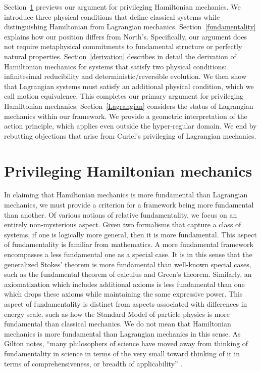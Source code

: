 \documentclass[12pt, twoside]{article}
\begin{document}
Section~\ref{privileging} previews our argument for privileging Hamiltonian mechanics. We introduce three physical conditions that define classical systems while distinguishing Hamiltonian from Lagrangian mechanics. Section~\ref{fundamentality} explains how our position differs from North's. Specifically, our argument does not require metaphysical commitments to fundamental structure or perfectly natural properties. Section~\ref{derivation} describes in detail the derivation of Hamiltonian mechanics for systems that satisfy two physical conditions: infinitesimal reducibility and deterministic/reversible evolution. We then show that Lagrangian systems must satisfy an additional physical condition, which we call motion equivalence. This completes our primary argument for privileging Hamiltonian mechanics. Section~\ref{Lagrangian} considers the status of Lagrangian mechanics within our framework. We provide a geometric interpretation of the action principle, which applies even outside the hyper-regular domain. We end by rebutting objections that arise from Curiel's \parencites*[]{Curiel} privileging of Lagrangian mechanics. 




\section{Privileging Hamiltonian mechanics}
\label{privileging}

In claiming that Hamiltonian mechanics is more fundamental than Lagrangian mechanics, we must provide a criterion for a framework being more fundamental than another. Of various notions of relative fundamentality, we focus on an entirely non-mysterious aspect. Given two formalisms that capture a class of systems, if one is logically more general, then it is more fundamental. This aspect of fundamentality is familiar from mathematics. A more fundamental framework encompasses a less fundamental one as a special case. It is in this sense that the generalized Stokes' theorem is more fundamental than well-known special cases, such as the fundamental theorem of calculus and Green's theorem. Similarly, an axiomatization which includes additional axioms is less fundamental than one which drops these axioms while maintaining the same expressive power. This aspect of fundamentality is distinct from aspects associated with differences in energy scale, such as how the Standard Model of particle physics is more fundamental than classical mechanics. We do not mean that Hamiltonian mechanics is more fundamental than Lagrangian mechanics in this sense. As Gilton notes, ``many philosophers of science have moved away from thinking of fundamentality in science in terms of the very small toward thinking of it in terms of comprehensiveness, or breadth of applicability'' \parencites*[637]{Gilton2021}.
\end{document}
